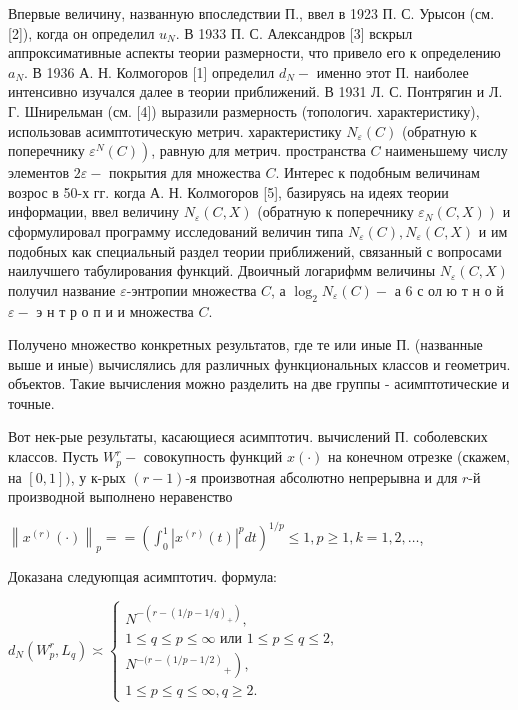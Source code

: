 \documentclass[10pt]{article}
\begin{document}
Впервые величину, названную впоследствии П., ввел в 1923 П. С. Урысон (см. [2]), когда он определил $u_{N}$. В 1933 П. С. Александров [3] вскрыл аппроксимативные аспекты теории размерности, что привело его к определению $a_{N}$. В 1936 А. Н. Колмогоров [1] определил $d_{N}-$ именно этот П. наиболее интенсивно изучался далее в теории приближений. В 1931 Л. С. Понтрягин и Л. Г. Шнирельман (см. [4]) выразили размерность (топологич. характеристику), использовав асимптотическую метрич. характеристику $N_{\varepsilon}(C)$ (обратную к поперечнику $\left.\varepsilon^{N}(C)\right)$, равную для метрич. пространства $C$ наименьшему числу элементов $2 \varepsilon-$ покрытия для множества $C$. Интерес к подобным величинам возрос в 50-х гг. когда А. Н. Колмогоров [5], базируясь на идеях теории информации, ввел величину $N_{\varepsilon}(C, X)$ (обратную к поперечнику $\left.\varepsilon_{N}(C, X)\right)$ и сформулировал программу исследований величин типа $N_{\varepsilon}(C), N_{\varepsilon}(C, X)$ и им подобных как специальный раздел теории приближений, связанный с вопросами наилучшего табулирования функций. Двоичный логарифмм величины $N_{\varepsilon}(C, X)$ получил название $\varepsilon$-энтропии множества $C$, а $\log _{2} N_{\varepsilon}(C)-$ а 6 с ол ю т н о й $\varepsilon-$ э н т р о п и и множества $C$.



Получено множество конкретных результатов, где те или иные П. (названные выше и иные) вычислялись для различных функциональных классов и геометрич. объектов. Такие вычисления можно разделить на две группы - асимптотические и точные.



Вот нек-рые результаты, касающиеся асимптотич. вычислений П. соболевских классов. Пусть $W_{p}^{r}-$ совокупность функций $x(\cdot)$ на конечном отрезке (скажем, на $[0,1])$, у к-рых $(r-1)$-я произвотная абсолютно непрерывна и для $r$-й производной выполнено неравенство



$\left\|x^{(r)}(\cdot)\right\|_{p}==\left(\int_{0}^{1}\left|x^{(r)}(t)\right|^{p} d t\right)^{1 / p} \leqslant 1, p \geqslant 1, k=1,2, \ldots$,



Доказана следуюпцая асимптотич. формула:



$d_{N}\left(W_{p}^{r}, L_{q}\right) \asymp\left\{\begin{array}{l}N^{-\left(r-(1 / p-1 / q)_{+}\right)}, \\ 1 \leqslant q \leqslant p \leqslant \infty \text { или } 1 \leqslant p \leqslant q \leqslant 2, \\ \left.N^{-(r-(1 / p-1 / 2)}{ }_{+}\right), \\ 1 \leqslant p \leqslant q \leqslant \infty, q \geqslant 2 .\end{array}\right.$
\end{document}
